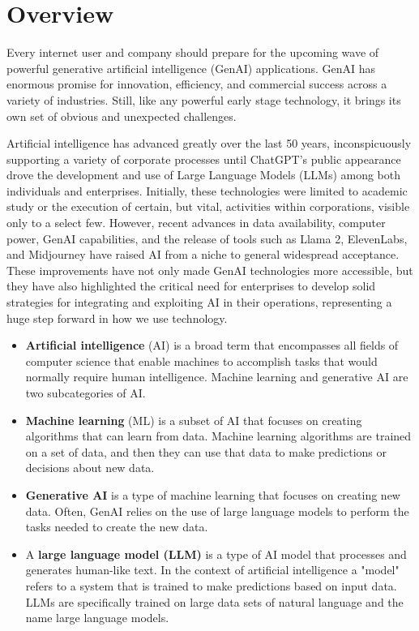 

\headerimage
\chapter{Overview}
Every internet user and company should prepare for the upcoming wave of powerful generative artificial intelligence (GenAI) applications. GenAI has enormous promise for innovation, efficiency, and commercial success across a variety of industries. Still, like any powerful early stage technology, it brings its own set of obvious and unexpected challenges.

Artificial intelligence has advanced greatly over the last 50 years, inconspicuously supporting a variety of corporate processes until ChatGPT's public appearance drove the development and use of Large Language Models (LLMs) among both individuals and enterprises. Initially, these technologies were limited to academic study or the execution of certain, but vital, activities within corporations, visible only to a select few. However, recent advances in data availability, computer power, GenAI capabilities, and the release of tools such as Llama 2, ElevenLabs, and Midjourney have raised AI from a niche to general widespread acceptance. These improvements have not only made GenAI technologies more accessible, but they have also highlighted the critical need for enterprises to develop solid strategies for integrating and exploiting AI in their operations, representing a huge step forward in how we use technology.


\begin{itemize}
  \item \textbf{Artificial intelligence} (AI)  is a broad term that encompasses all fields of computer science that enable machines to accomplish tasks that would normally require human intelligence. Machine learning and generative AI are two subcategories of AI.
  \item \textbf{Machine learning} (ML) is a subset of AI that focuses on creating algorithms that can learn from data. Machine learning algorithms are trained on a set of data, and then they can use that data to make predictions or decisions about new data.
  \item \textbf{Generative AI} is a type of machine learning that focuses on creating new data. Often, GenAI relies on the use of large language models to perform the tasks needed to create the new data.
  \item A \textbf{large language model (LLM)} is a type of AI model that processes and generates human-like text. In the context of artificial intelligence a "model" refers to a system that is trained to make predictions based on input data. LLMs are specifically trained on large data sets of natural language and the name large language models.

\end{itemize}

